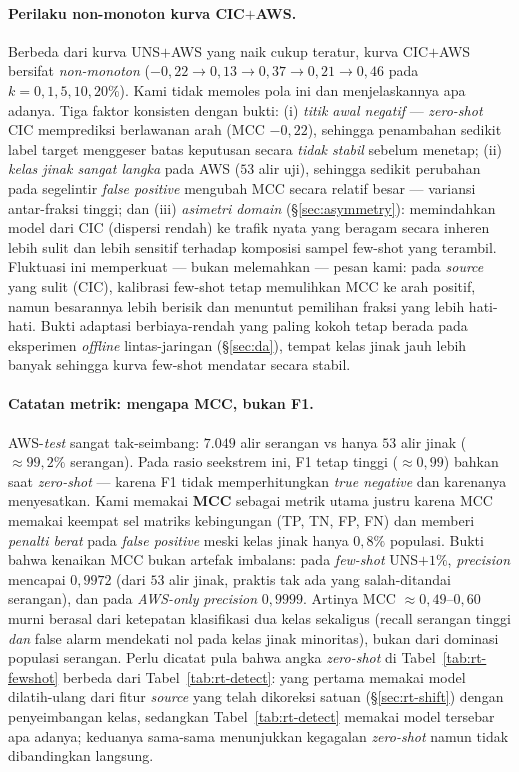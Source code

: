 \documentclass[11pt,a4paper]{article}
\begin{document}
\paragraph{Perilaku non-monoton kurva CIC$+$AWS.} Berbeda dari kurva UNS$+$AWS
yang naik cukup teratur, kurva CIC$+$AWS bersifat \emph{non-monoton}
($-0{,}22 \to 0{,}13 \to 0{,}37 \to 0{,}21 \to 0{,}46$ pada $k=0,1,5,10,20\%$).
Kami tidak memoles pola ini dan menjelaskannya apa adanya. Tiga faktor konsisten
dengan bukti: (i) \emph{titik awal negatif} --- \emph{zero-shot} CIC memprediksi
berlawanan arah (MCC $-0{,}22$), sehingga penambahan sedikit label target menggeser
batas keputusan secara \emph{tidak stabil} sebelum menetap; (ii) \emph{kelas jinak
sangat langka} pada AWS ($53$ alir uji), sehingga sedikit perubahan pada segelintir
\emph{false positive} mengubah MCC secara relatif besar --- variansi antar-fraksi
tinggi; dan (iii) \emph{asimetri domain} (\S\ref{sec:asymmetry}): memindahkan model
dari CIC (dispersi rendah) ke trafik nyata yang beragam secara inheren lebih sulit
dan lebih sensitif terhadap komposisi sampel few-shot yang terambil. Fluktuasi ini
memperkuat --- bukan melemahkan --- pesan kami: pada \emph{source} yang sulit (CIC),
kalibrasi few-shot tetap memulihkan MCC ke arah positif, namun besarannya lebih
berisik dan menuntut pemilihan fraksi yang lebih hati-hati. Bukti adaptasi
berbiaya-rendah yang paling kokoh tetap berada pada eksperimen \emph{offline}
lintas-jaringan (\S\ref{sec:da}), tempat kelas jinak jauh lebih banyak sehingga
kurva few-shot mendatar secara stabil.
\paragraph{Catatan metrik: mengapa MCC, bukan F1.} AWS-\emph{test} sangat
tak-seimbang: $7{.}049$ alir serangan vs hanya $53$ alir jinak ($\approx 99{,}2\%$
serangan). Pada rasio seekstrem ini, F1 tetap tinggi ($\approx 0{,}99$) bahkan saat
\emph{zero-shot} --- karena F1 tidak memperhitungkan \emph{true negative} dan
karenanya menyesatkan. Kami memakai \textbf{MCC} sebagai metrik utama justru karena
MCC memakai keempat sel matriks kebingungan (TP, TN, FP, FN) dan memberi
\emph{penalti berat} pada \emph{false positive} meski kelas jinak hanya $0{,}8\%$
populasi. Bukti bahwa kenaikan MCC bukan artefak imbalans: pada \emph{few-shot}
UNS$+1\%$, \emph{precision} mencapai $0{,}9972$ (dari $53$ alir jinak, praktis tak
ada yang salah-ditandai serangan), dan pada \emph{AWS-only} \emph{precision}
$0{,}9999$. Artinya MCC $\approx 0{,}49$--$0{,}60$ murni berasal dari ketepatan
klasifikasi dua kelas sekaligus (recall serangan tinggi \emph{dan} false alarm
mendekati nol pada kelas jinak minoritas), bukan dari dominasi populasi serangan.
Perlu dicatat pula bahwa angka \emph{zero-shot} di
Tabel~\ref{tab:rt-fewshot} berbeda dari Tabel~\ref{tab:rt-detect}: yang pertama
memakai model dilatih-ulang dari fitur \emph{source} yang telah dikoreksi satuan
(\S\ref{sec:rt-shift}) dengan penyeimbangan kelas, sedangkan Tabel~\ref{tab:rt-detect}
memakai model tersebar apa adanya; keduanya sama-sama menunjukkan kegagalan
\emph{zero-shot} namun tidak dibandingkan langsung.
\end{document}
